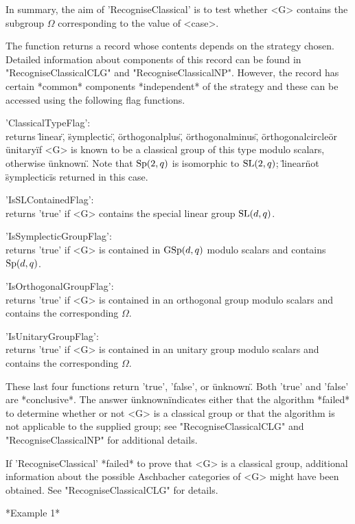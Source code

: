 In summary,   the aim  of  'RecogniseClassical'  is to test   whether <G>
contains the subgroup $\Omega$ corresponding to the value of <case>.

The function returns   a record whose contents  depends  on  the strategy
chosen.   Detailed information about   components of this  record  can be
found in  "RecogniseClassicalCLG" and   "RecogniseClassicalNP".  However,
the record has certain  *common* components *independent* of the strategy
and these can be accessed using the following flag functions.

'ClassicalTypeFlag':\\
    returns       \"linear\",    \"symplectic\",      \"orthogonalplus\",
    \"orthogonalminus\", \"orthogonalcircle\"  or  \"unitary\" if <G>  is
    known to be a classical group  of this type modulo scalars, otherwise
    \"unknown\".  Note   that ${\rm Sp}(2,q)$   is isomorphic   to ${\rm SL}(2,q)$;
    \"linear\" not \"symplectic\" is returned in this case.

'IsSLContainedFlag':\\
    returns 'true' if <G> contains the special linear group ${\rm SL}(d,q)$.

'IsSymplecticGroupFlag':\\
    returns 'true' if <G> is  contained in ${\rm GSp}(d,q)$ modulo scalars and
    contains ${\rm Sp}(d,q)$.
    
'IsOrthogonalGroupFlag':\\
    returns 'true'  if  <G> is contained  in an  orthogonal group modulo
    scalars and contains the corresponding $\Omega$.
    
'IsUnitaryGroupFlag':\\
    returns 'true' if <G> is contained in an unitary group modulo scalars
    and contains the corresponding $\Omega$.

These last  four functions return 'true',  'false', or \"unknown\".  Both
'true'  and 'false' are *conclusive*.    The answer \"unknown\" indicates
either that the  algorithm *failed* to determine whether  or not <G> is a
classical group or that  the algorithm is  not applicable to the supplied
group;   see   "RecogniseClassicalCLG"  and    "RecogniseClassicalNP" for
additional details.

If 'RecogniseClassical' *failed* to prove  that <G> is a classical group,
additional information  about the possible  Aschbacher categories  of <G>
might have been obtained.  See "RecogniseClassicalCLG" for details.

*Example 1* 

